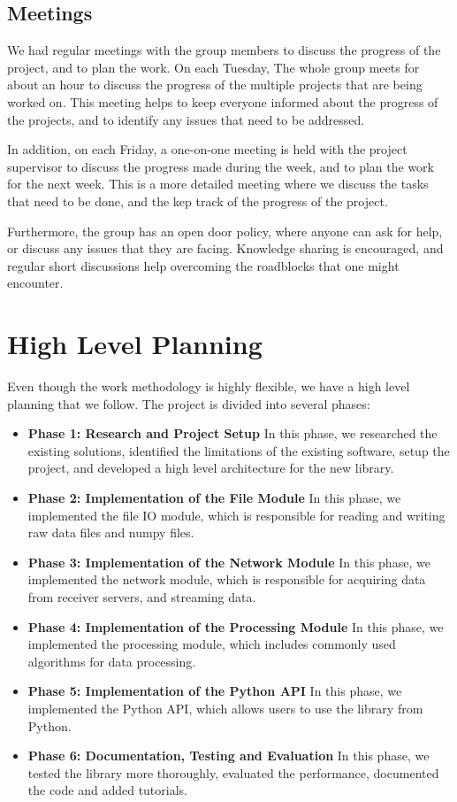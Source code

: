 \begin{spacing}{1.2}
\begin{itemize}
    \end{itemize}

    \subsection{Meetings}
    We had regular meetings with the group members to discuss the progress of the project, and to plan the work.
    On each Tuesday, The whole group meets for about an hour to discuss the progress of the multiple projects that are being worked on.
    This meeting helps to keep everyone informed about the progress of the projects, and to identify any issues that need to be addressed.

    In addition, on each Friday, a one-on-one meeting is held with the project supervisor to discuss the progress made during the week,
    and to plan the work for the next week. This is a more detailed meeting where we discuss the tasks that need to be done, and the
    kep track of the progress of the project.

    Furthermore, the group has an open door policy, where anyone can ask for help, or discuss any issues that they are facing.
    Knowledge sharing is encouraged, and regular short discussions help overcoming the roadblocks that one might encounter.
    \section{High Level Planning}
    Even though the work methodology is highly flexible, we have a high level planning that we follow.
    The project is divided into several phases:
    \begin{itemize}
        \item \textbf{Phase 1: Research and Project Setup} In this phase, we researched the existing solutions, identified the limitations of the existing software,
              setup the project, and developed a high level architecture for the new library.
        \item \textbf{Phase 2: Implementation of the File Module} In this phase, we implemented the file IO module, which is responsible for reading and writing raw data files and numpy files.
        \item \textbf{Phase 3: Implementation of the Network Module} In this phase, we implemented the network module, which is responsible for acquiring data from receiver servers, and streaming data.
        \item \textbf{Phase 4: Implementation of the Processing Module} In this phase, we implemented the processing module, which includes commonly used algorithms for data processing.
        \item \textbf{Phase 5: Implementation of the Python API} In this phase, we implemented the Python API, which allows users to use the library from Python.
        \item \textbf{Phase 6: Documentation, Testing and Evaluation} In this phase, we tested the library more thoroughly, evaluated the performance, documented the code and added tutorials.
    \end{itemize}


\end{spacing}
